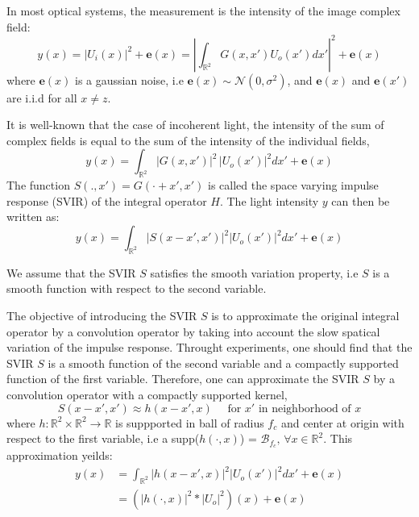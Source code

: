 \documentclass{article}
\begin{document}
In most optical systems, the measurement is the intensity of the image complex field:
\begin{equation}
    y(x) = |U_i(x)|^2 + \boldsymbol{e}(x) =  \left|\int_{\mathbb{R}^2} G(x,x') U_o(x') dx'\right|^2 + \boldsymbol{e}(x)
\end{equation}
where $\boldsymbol{e}(x)$ is a gaussian noise, i.e $\boldsymbol{e}(x) \sim \mathcal{N}(0, \sigma^2)$, and $\boldsymbol{e}(x)$ and $\boldsymbol{e}(x')$ are i.i.d for all $x \neq z $.

It is well-known that the case of incoherent light, the intensity of the sum of complex fields is equal to the sum of the intensity of the individual fields, 
\begin{equation}
    y(x) = \int_{\mathbb{R}^2} |G(x,x')|^2 \, |U_o(x')|^2 dx' + \boldsymbol{e}(x)
\end{equation}
The function $S(., x') = G(\cdot + x', x')$ is called the space varying impulse response (SVIR) of the integral operator $H$. The light intensity $y$ can then be written as:
\begin{equation}
    y(x) = \int_{\mathbb{R}^2} |S(x-x',x')|^2 |U_o(x')|^2 dx' + \boldsymbol{e}(x)
\end{equation}
 
We assume that the SVIR $S$ satisfies the smooth variation property, i.e $S$ is a smooth function with respect to the second variable.

The objective of introducing the SVIR $S$ is to approximate the original integral operator by a convolution operator by taking into account the slow spatical variation of the impulse response.
Throught experiments, one should find that the SVIR $S$ is a smooth function of the second variable and a compactly supported function of the first variable. Therefore, one can approximate the SVIR $S$ by a convolution operator with a compactly supported kernel,
\begin{equation}
    S(x-x',x') \approx h(x-x', x) \quad \mbox{ for } x' \mbox{ in neighborhood of } x
\end{equation} 
where $h:\mathbb{R}^2 \times \mathbb{R}^2 \to \mathbb{R}$ is suppported in ball of radius $f_c$ and center at origin with respect to the first variable, i.e a supp($h(\cdot, x)$) = $\mathcal{B}_{f_c},\, \forall x\in \mathbb{R}^2$. 
This approximation yeilds:
\begin{align}
    y(x) &= \int_{\mathbb{R}^2} |h(x-x', x)|^2 |U_o(x')|^2 dx' + \boldsymbol{e}(x)\\
    &= \left(|h(\cdot, x)|^2 \ast |U_o|^2\right)(x) + \boldsymbol{e}(x) 
\end{align}
\end{document}
